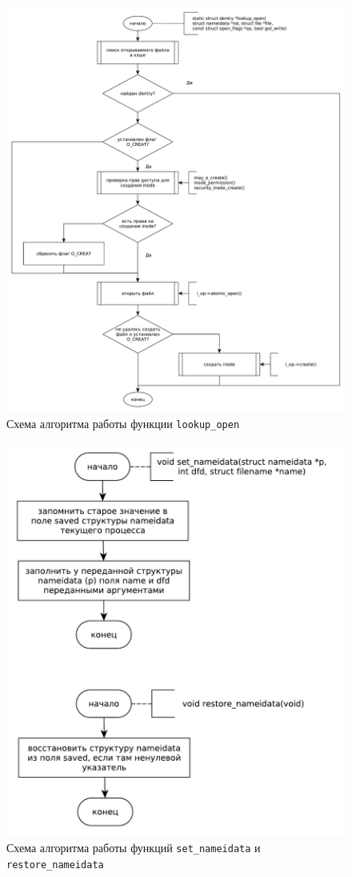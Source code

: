 \clearpage

\begin{figure}[h!btp]
	\centering
	\includegraphics[width=490pt]{inc/lookup_open.pdf}
	\caption{Схема алгоритма работы функции \texttt{lookup\_open}}
\end{figure}

\clearpage

\begin{figure}[h!btp]
	\centering
	\includegraphics[width=490pt]{inc/nameidata.pdf}
	\caption{Схема алгоритма работы функций \texttt{set\_nameidata} и \texttt{restore\_nameidata}}
\end{figure}